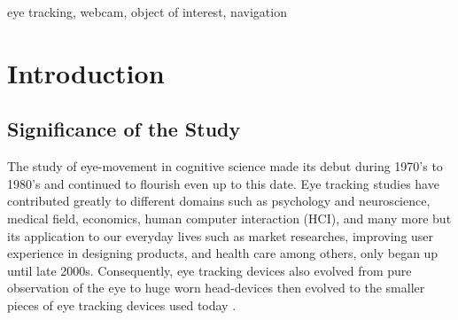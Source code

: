 \documentclass[journal]{./IEEE/IEEEtran}
\title{\SPTITLE}
\author{\ADVISEE~and~\ADVISER%
\REMARK
}
\begin{document}
\maketitle

\begin{abstract}

%

eyeGalaw is a Google Chrome extension that uses eye movements to navigate webpages using an ordinary camera. Functions include  scrolling up and down, back and forward page, hide and show interface,  and enabling and disabling scrolling. Using this extension, the user can normally browse a webpage by clicking and scrolling  and at the same time navigate using eye movements. eyeGalaw offers a new experience in web navigation, and can possibly revolutionize webpage navigation that caters for everyone, even for people with special needs. 


\end{abstract}



\begin{keywords}
eye tracking, webcam, object of interest, navigation
\end{keywords}

\section{Introduction}

\subsection{Significance of the Study}

The study of eye-movement in cognitive science made its debut during 1970's to 1980's and continued to flourish even up to this date. Eye tracking studies have contributed greatly to different domains such as psychology and neuroscience, medical field, economics, human computer interaction (HCI), and many more \cite{Imotions} but its application to our everyday lives such as market researches, improving user experience in designing products, and health care among others,  only began up until late 2000s. Consequently, eye tracking devices also evolved from pure observation of the eye to huge worn head-devices then evolved  to the smaller pieces of eye tracking devices used today  \cite{Eyesee}.
\end{document}
